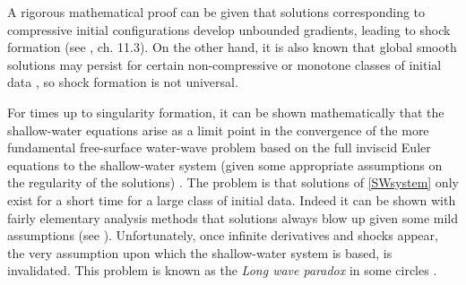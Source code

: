 \documentclass[reqno,12pt,a4paper]{article}
\theoremstyle{plain}
\begin{document}
A rigorous mathematical proof can be given that solutions corresponding to compressive initial configurations develop unbounded gradients,
leading to shock formation (see \cite{Evans}, ch. 11.3).
On the other hand,
it is also known that global smooth solutions may persist
for certain non-compressive or monotone classes of initial data
\cite{Bressan2000, Lax1973},
so shock formation is not universal.


For times up to singularity formation, it can be shown mathematically
that the shallow-water equations arise as a limit point in the convergence 
of the more fundamental free-surface water-wave problem based on the 
full inviscid Euler equations to the shallow-water system
(given some appropriate assumptions on the regularity of the solutions)
\cite{Lannes}.
The problem is that solutions of \eqref{SWsystem} only exist for a short
time for a large class of initial data.
Indeed it can be shown with fairly elementary analysis methods
that solutions always blow up given some mild assumptions (see \cite{Evans}).
Unfortunately, once infinite derivatives and shocks appear, the
very assumption upon which the shallow-water system is based, is invalidated.
This problem is known as the {\it Long wave paradox} in some circles
\cite{LeMehaute,Ursell1953}.

\end{document}
